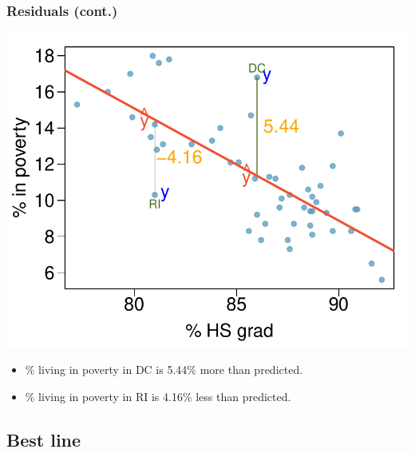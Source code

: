\begin{frame}
\frametitle{Residuals (cont.)}

\vspace{-0.5cm}
{
\begin{center}
\includegraphics[width=\textwidth]{8-2_least_square_reg/figures/poverty/poverty_hsgrad_res_text}
\end{center}
}
{
\pause
\begin{itemize}
\item \% living in poverty in DC is 5.44\% more than predicted.
\pause
\item \% living in poverty in RI is 4.16\% less than predicted.
\end{itemize}
}


\end{frame}


\subsection{Best line}


